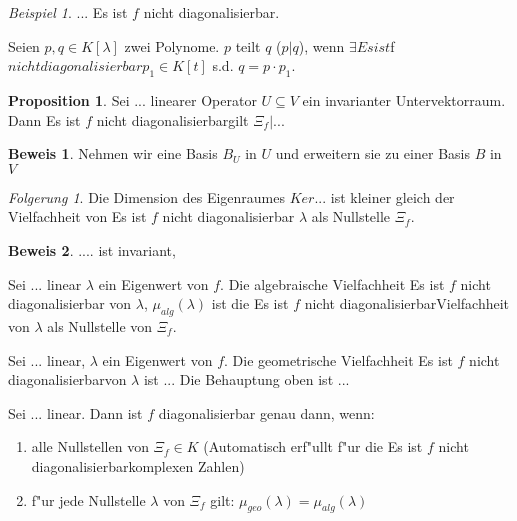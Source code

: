 \documentclass[11pt]{article}
\theoremstyle{remark}
\newtheorem{exa}{Beispiel}[section]
\newtheorem{folgerung}{Folgerung}
\theoremstyle{definition}
\newtheorem{prof}{Beweis}
\newtheorem*{proposition}{Proposition}
\theoremstyle{remark}
\begin{document}
\begin{exa}
  ...
  Es ist $f$ nicht diagonalisierbar.
\end{exa}

\begin{definition}
  Seien $p,q\in K[\lambda]$ zwei Polynome. $p$ teilt $q$ ($p|q$), wenn $\exists
  Es ist $f$ nicht diagonalisierbarp_1 \in K[t]$ s.d. $q= p\cdot p_1$. 
\end{definition}

\begin{proposition}
  Sei ... linearer Operator $U\subseteq V$ ein invarianter Untervektorraum. Dann
  Es ist $f$ nicht diagonalisierbargilt $\Xi_{f} | $... 
\end{proposition}
\begin{prof}
  Nehmen wir eine Basis $B_U$ in $U$ und erweitern sie zu einer Basis $B$ in $V$
\end{prof}

\begin{folgerung}
  Die Dimension des Eigenraumes $Ker...$ ist kleiner gleich der Vielfachheit von
  Es ist $f$ nicht diagonalisierbar $\lambda$ als Nullstelle $\Xi_f$.
\end{folgerung}

\begin{prof}
  .... ist invariant, 
\end{prof}

\begin{definition}
  Sei ... linear $\lambda$ ein Eigenwert von $f$. Die algebraische Vielfachheit
  Es ist $f$ nicht diagonalisierbar von $\lambda$, $\mu_{alg}(\lambda)$ ist die
  Es ist $f$ nicht diagonalisierbarVielfachheit von $\lambda$ als Nullstelle von $\Xi_f$.
\end{definition}

\begin{definition}
  Sei ... linear, $\lambda$ ein Eigenwert von $f$. Die geometrische Vielfachheit
  Es ist $f$ nicht diagonalisierbarvon $\lambda$ ist ...
  Die Behauptung oben ist ...
\end{definition}

\begin{theo}
  Sei ... linear. Dann ist $f$ diagonalisierbar genau dann, wenn:
  \begin{enumerate}
  \item alle Nullstellen von $\Xi_f \in K$ (Automatisch erf"ullt f"ur die
  Es ist $f$ nicht diagonalisierbarkomplexen Zahlen)
  \item f"ur jede Nullstelle $\lambda$ von $\Xi_f$ gilt: $\mu_{geo}(\lambda)=\mu_{alg}(\lambda)$
  \end{enumerate}
\end{theo}
\end{document}
